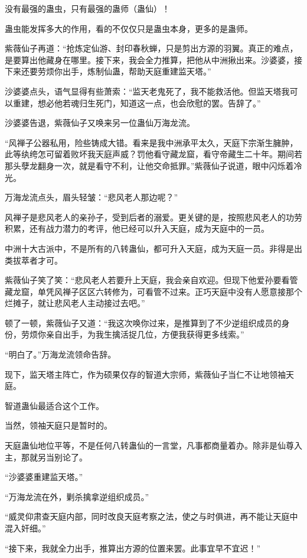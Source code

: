 \begin{this_body}
没有最强的蛊虫，只有最强的蛊师（蛊仙）！

蛊虫能发挥多大的作用，看的不仅仅只是蛊虫本身，更多的是蛊师。

紫薇仙子再道：“抢炼定仙游、封印春秋蝉，只是剪出方源的羽翼。真正的难点，是要算出他藏身在哪里。接下来，我会全力推算，把他从中洲揪出来。沙婆婆，接下来还要劳烦你出手，炼制仙蛊，帮助天庭重建监天塔。”

沙婆婆点头，语气显得有些萧索：“监天老鬼死了，我不能救活他。但监天塔我可以重建，想必他若魂归生死门，知道这一点，也会欣慰的罢。告辞了。”

沙婆婆告退，紫薇仙子又唤来另一位蛊仙万海龙流。

“风禅子公器私用，险些铸成大错。看来是我中洲承平太久，天庭下宗渐生臃肿，此等纨绔怎可留着败坏我天庭声威？罚他看守藏龙窟，看守帝藏生二十年。期间若那头孽龙翻身一次，就是看守不利，让他交命抵罪。”紫薇仙子说道，眼中闪烁着冷光。

万海龙流点头，眉头轻皱：“悲风老人那边呢？”

风禅子是悲风老人的亲孙子，受到后者的溺爱。更关键的是，按照悲风老人的功劳积累，还有战力潜力的考评，他已经可以升入天庭，成为天庭中的一员。

中洲十大古派中，不是所有的八转蛊仙，都可升入天庭，成为天庭一员。非得是出类拔萃者才可。

紫薇仙子笑了笑：“悲风老人若要升上天庭，我会亲自欢迎。但现下他爱孙要看管藏龙窟，单凭风禅子区区六转修为，可看管不过来。正巧天庭中没有人愿意接那个烂摊子，就让悲风老人主动接过去吧。”

顿了一顿，紫薇仙子又道：“我这次唤你过来，是推算到了不少逆组织成员的身份，劳烦你亲自出手，为我生擒活捉几位，方便我获得更多线索。”

“明白了。”万海龙流领命告辞。

现下，监天塔主阵亡，作为硕果仅存的智道大宗师，紫薇仙子当仁不让地领袖天庭。

智道蛊仙最适合这个工作。

当然，领袖天庭只是暂时的。

天庭蛊仙地位平等，不是任何八转蛊仙的一言堂，凡事都商量着办。除非是仙尊入主，那就另当别论了。

“沙婆婆重建监天塔。”

“万海龙流在外，剿杀擒拿逆组织成员。”

“威灵仰肃查天庭内部，同时改良天庭考察之法，使之与时俱进，再不能让天庭中混入奸细。”

“接下来，我就全力出手，推算出方源的位置来罢。此事宜早不宜迟！”


\end{this_body}
